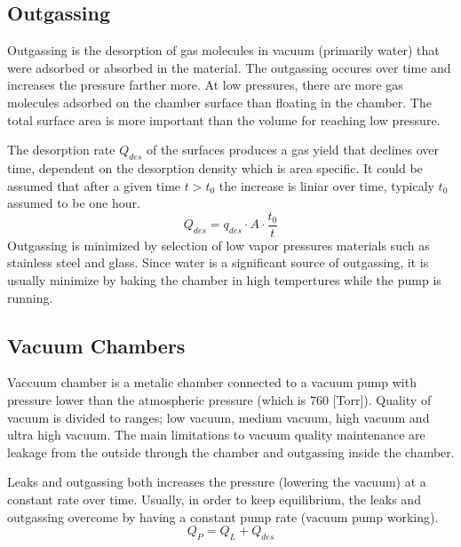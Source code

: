\documentclass[\main/master.tex]{subfiles}
\begin{document}
\subsection{Outgassing}
Outgassing is the desorption of gas molecules in vacuum (primarily water)  that were adsorbed or absorbed in the material. The outgassing occures over time and increases the pressure farther more. At low pressures, there are more gas molecules adsorbed on the chamber surface than floating in the chamber. The total surface area is more important than the volume for reaching low pressure. 
\par
The desorption rate $Q_{des}$ of the surfaces produces a gas yield that declines over time, dependent on the desorption density which is area specific. It could be assumed that after a given time $t>t_0$ the increase is liniar over time, typicaly $t_0$ assumed to be one hour.
\begin{equation}
Q_{des} = q_{des}\cdot A\cdot\frac{t_0}{t}  \label{eqn:energy-mass-equivalence-relation}
\end{equation}
Outgassing is minimized by selection of low vapor pressures materials such as stainless steel and glass. Since water is a significant source of outgassing, it is usually minimize by baking the chamber in high tempertures while the pump is running.
\subsection{Vacuum Chambers}
Vaccuum chamber is a metalic chamber connected to a vacuum pump with pressure lower than the atmospheric pressure (which is 760 [Torr]). Quality of vacuum is divided to ranges; low vacuum, medium vacuum, high vacuum and ultra high vacuum. The main limitations to vacuum quality maintenance are leakage from the outside through the chamber and outgassing inside the chamber.
\par
Leaks and outgassing both increases the pressure (lowering the vacuum) at a constant rate over time. Usually, in order to keep equilibrium, the leaks and outgassing overcome by having a constant pump rate (vacuum pump working).   
\begin{equation}
Q_P = Q_L + Q_{des}  \label{eqn:vacuum_equilibrium}
\end{equation}
\end{document}
